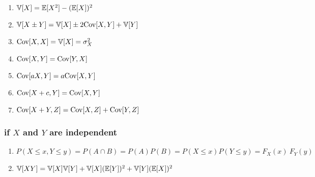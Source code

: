 \begin{multicols}{2}
\begin{enumerate}[resume*=calcrulesrv]
    \item $\mathbb{V}[X] = \mathbb{E}[X^2] - (\mathbb{E}[X])^2$
    \hfill \cite{statistics/book/Statistics-for-Data-Scientists/Maurits-Kaptein, mfml/book/mml/Deisenroth-Faisal-Ong}

    \item $\mathbb{V}[X \pm Y] = \mathbb{V}[X] \pm 2\text{Cov}[X, Y] + \mathbb{V}[Y]$
    \hfill \cite{statistics/book/Statistics-for-Data-Scientists/Maurits-Kaptein, mfml/book/mml/Deisenroth-Faisal-Ong}




    \item $\text{Cov}[X, X] = \mathbb{V}[X] = \sigma^2_X$
    \hfill \cite{statistics/book/Statistics-for-Data-Scientists/Maurits-Kaptein}

    \item $\text{Cov}[X, Y] = \text{Cov}[Y, X]$
    \hfill \cite{statistics/book/Statistics-for-Data-Scientists/Maurits-Kaptein}

    \item $\text{Cov}[aX, Y] = a\text{Cov}[X, Y]$
    \hfill \cite{statistics/book/Statistics-for-Data-Scientists/Maurits-Kaptein}

    \item $\text{Cov}[X + c, Y] = \text{Cov}[X, Y]$
    \hfill \cite{statistics/book/Statistics-for-Data-Scientists/Maurits-Kaptein}

    \item $\text{Cov}[X + Y, Z] = \text{Cov}[X, Z] + \text{Cov}[Y, Z]$
    \hfill \cite{statistics/book/Statistics-for-Data-Scientists/Maurits-Kaptein}
\end{enumerate}
\end{multicols}




\subsubsection{if $X$ and $Y$ are independent}



\begin{enumerate}[resume*=calcrulesrv]
    \item
    $
        P(X \leq x, Y \leq y)
        = P(A \cap B)
        = P(A) P(B)
        = P(X \leq x) P(Y \leq y)
        = F _X (x)\ F_Y (y)
    $
    \hfill \cite{statistics/book/Statistics-for-Data-Scientists/Maurits-Kaptein}

    \item
    $
        \mathbb{V}[X Y]
        = \mathbb{V}[X] \mathbb{V}[Y] + \mathbb{V}[X](\mathbb{E}[Y])^2 + \mathbb{V}[Y](\mathbb{E}[X])^2
    $
    \hfill \cite{statistics/book/Statistics-for-Data-Scientists/Maurits-Kaptein}
\end{enumerate}


